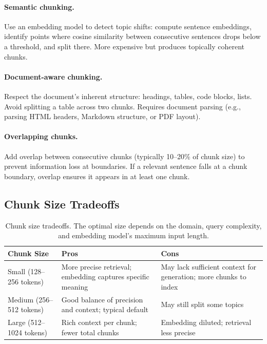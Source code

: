 \paragraph{Semantic chunking.}
Use an embedding model to detect topic shifts: compute sentence embeddings,
identify points where cosine similarity between consecutive sentences drops
below a threshold, and split there.  More expensive but produces topically
coherent chunks.

\paragraph{Document-aware chunking.}
Respect the document's inherent structure: headings, tables, code blocks,
lists.  Avoid splitting a table across two chunks.  Requires document parsing
(e.g., parsing HTML headers, Markdown structure, or PDF layout).

\paragraph{Overlapping chunks.}
Add overlap between consecutive chunks (typically 10--20\% of chunk size)
to prevent information loss at boundaries.  If a relevant sentence falls
at a chunk boundary, overlap ensures it appears in at least one chunk.

\subsection{Chunk Size Tradeoffs}

\begin{table}[H]
\centering
\small
\begin{tabularx}{\textwidth}{@{}l X X@{}}
\toprule
\textbf{Chunk Size} & \textbf{Pros} & \textbf{Cons} \\
\midrule
Small (128--256 tokens) & More precise retrieval; embedding captures specific meaning & May lack sufficient context for generation; more chunks to index \\
Medium (256--512 tokens) & Good balance of precision and context; typical default & May still split some topics \\
Large (512--1024 tokens) & Rich context per chunk; fewer total chunks & Embedding diluted; retrieval less precise \\
\bottomrule
\end{tabularx}
\caption{Chunk size tradeoffs.  The optimal size depends on the domain, query
complexity, and embedding model's maximum input length.}
\label{tab:chunk-size}
\end{table}

